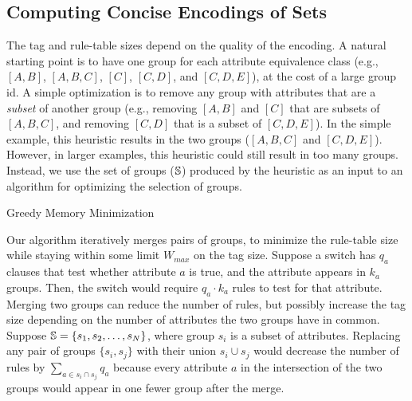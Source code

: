 \subsection{Computing Concise Encodings of Sets}
\label{ssec:merge}
The tag and rule-table sizes depend on the quality of the encoding.  A
natural starting point is to have one group for each attribute
equivalence class (e.g., $[A,B]$, $[A,B,C]$, $[C]$, $[C,D]$, and
$[C,D,E]$), at the cost of a large group id.  A simple optimization is
to remove any group with attributes that are a \emph{subset} of
another group (e.g., removing $[A,B]$ and $[C]$ that are subsets of
$[A,B,C]$, and removing $[C,D]$ that is a subset of $[C,D,E]$).  In
the simple example, this heuristic results in the two groups
($[A,B,C]$ and $[C,D,E]$).  However, in larger examples, this
heuristic could still result in too many groups. Instead, we use the
set of groups ($\mathbb{S}$) produced by the heuristic as an input to an
algorithm for optimizing the selection of groups.

\begin{algorithm}
\DontPrintSemicolon
{}
\caption{Greedy Memory Minimization\label{alg:memory_min}}
\end{algorithm}

Our algorithm iteratively merges pairs of groups, to minimize the
rule-table size while staying within some limit $W_{max}$ on the tag
size.  Suppose a switch has $q_a$ clauses that test whether attribute
$a$ is true, and the attribute appears in $k_a$ groups.  Then, the
switch would require $q_a \cdot k_a$ rules to test for that attribute.
Merging two groups can reduce the number of rules, but possibly
increase the tag size depending on the number of attributes the two
groups have in common.  Suppose $\mathbb{S} = \{s_1, s_2, \dots, s_N\}$,
where group $s_i$ is a subset of attributes.  Replacing any pair of
groups $\{s_i, s_j\}$ with their union $s_i\cup s_j$ would decrease
the number of rules by $\sum_{a \in s_i\cap s_j}q_a$ because every
attribute $a$ in the intersection of the two groups would appear in
one fewer group after the merge.

